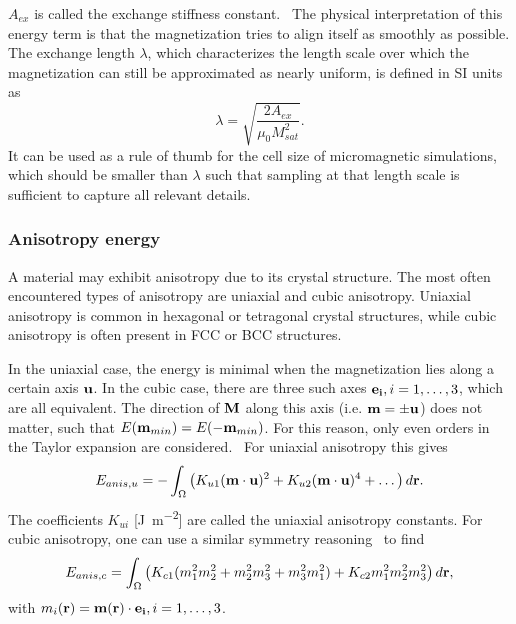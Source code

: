 \documentclass[11pt,a4paper,english]{article}
\begin{document}
$A_{ex}$ is called the exchange stiffness constant.~\cite{Gilbert1956} The physical interpretation of this energy term is that the magnetization tries to align itself as smoothly as possible.
The exchange length $\lambda$, which characterizes the length scale over which the magnetization can still be approximated as nearly uniform, is defined in SI units \cite{ExchangeLength, ExchangeLength_original, MuMax3} as
\begin{equation}
    \lambda = \sqrt{\frac{2 A_{ex}}{\mu_0 M_{sat}^2}} \mathrm{.}
    \label{eq:Energy_ExchangeEnergy_ExchangeLength}
\end{equation}
It can be used as a rule of thumb for the cell size of micromagnetic simulations, which should be smaller than $\lambda$ such that sampling at that length scale is sufficient to capture all relevant details.~\cite{ExchangeLength}

\subsubsection{Anisotropy energy}
A material may exhibit anisotropy due to its crystal structure. The most often encountered types of anisotropy are uniaxial and cubic anisotropy. Uniaxial anisotropy is common in hexagonal or tetragonal crystal structures, while cubic anisotropy is often present in FCC or BCC structures.~\cite{Gilbert1956, abert2013discrete} \par
In the uniaxial case, the energy is minimal when the magnetization lies along a certain axis $\vb{u}$. In the cubic case, there are three such axes $\vb{e_i}, i=1,\dots,3$, which are all equivalent. The direction of $\vb{M}$ along this axis (i.e. $\vb{m}=\pm \vb{u}$) does not matter, such that $E(\vb{m}_{min}) = E(-\vb{m}_{min})$. For this reason, only even orders in the Taylor expansion are considered.~\cite{abert2013discrete} For uniaxial anisotropy this gives
\begin{equation}
    E_{anis,u} = - \int_\Omega \big(K_{u1} (\vb{m} \cdot \vb{u})^2 + K_{u2} (\vb{m} \cdot \vb{u})^4 + \dots\big) \, d\vb{r} \mathrm{.} \label{eq:Energy_Term_AnisUniaxial}
\end{equation}
The coefficients $K_{ui}$ [\si{\joule\per\metre\squared}] are called the uniaxial anisotropy constants.
For cubic anisotropy, one can use a similar symmetry reasoning~\cite{abert2013discrete} to find
\begin{equation}
    E_{anis,c} = \int_\Omega \big(K_{c1} (m_1^2m_2^2 + m_2^2m_3^2 + m_3^2m_1^2) + K_{c2} m_1^2m_2^2m_3^2\big) \, d\vb{r} \mathrm{,} \label{eq:Energy_Term_AnisCubic}
\end{equation}
with $m_i(\vb{r}) = \vb{m}(\vb{r}) \cdot \vb{e_i}, i=1,\dots,3$.
\end{document}
